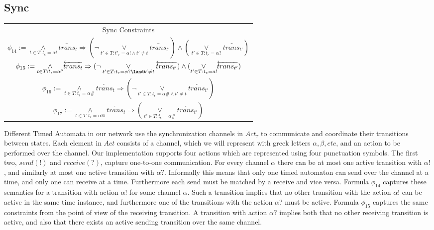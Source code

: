 \documentclass[a4paper,12pt]{article}
\begin{document}
\subsection{Sync}
\label{sec:org75072f2}
\begin{center}
\begin{tabular}{c}
Sync Constraints \\
\(\phi_{14} := \underset{t \in T: t_\epsilon = \alpha!}{\land} \overleftarrow{trans_t} \Rightarrow (\neg \underset{t' \in T: t'_\epsilon = \alpha!\land t'\neq t}{\lor} \overleftarrow{trans_{t'}}) \land (\underset{t' \in T: t_\epsilon = \alpha?}{\lor} \overleftarrow{trans_{t'}})\) \\
\midrule
\(\phi_{15} := \underset{t \in T: t_\epsilon = \alpha?}{\land} \overleftarrow{trans_t} \Rightarrow (\neg \underset{t' \in T:t_\epsilon = \alpha?\landt'\neq t}{\lor} \overleftarrow{trans_{t'}}) \land (\underset{t' \in T:t_\epsilon = a!}{\lor} \overleftarrow{trans_{t'}})\) \\
\midrule
\(\phi_{16} := \underset{t \in T:t_\epsilon = \alpha\#}{\land} \overleftarrow{trans_t} \Rightarrow (\neg \underset{t' \in T:t_\epsilon = \alpha\#\land t' \neq t}{\lor} \overleftarrow{trans_{t'}}) \) \\
\midrule
\(\phi_{17} := \underset{t \in T:t_\epsilon = \alpha@}{\land} \overleftarrow{trans_t} \Rightarrow (\underset{t' \in T: t_\epsilon = \alpha\#}{\lor} \overleftarrow{trans_{t'}}) \)

\end{tabular}
\end{center}

Different Timed Automata in our network use the synchronization channels in
\(Act_\tau\) to communicate and coordinate their transitions between states.
Each element in \(Act\) consists of a channel, which we will represent with
greek letters \(\alpha, \beta, etc\), and an action to be performed over the
channel. Our implementation supports four actions which are represented using
four punctuation symbols. The first two, \(send(!)\) and \(receive(?)\), capture
one-to-one communication. For every channel \(\alpha\) there can be at most one
active transition with \(\alpha!\), and similarly at most one active transition
with \(\alpha?\). Informally this means that only one timed automaton can send
over the channel at a time, and only one can receive at a time. Furthermore each
send must be matched by a receive and vice versa. Formula \(\phi_{14}\) captures
these semantics for a transition with action \(\alpha!\) for some channel
\(\alpha\). Such a transition implies that no other transition with the action
\(\alpha!\) can be active in the same time instance, and furthermore one of the
transitions with the action \(\alpha?\) must be active. Formula \(\phi_{15}\)
captures the same constraints from the point of view of the receiving
transition. A transition with action \(\alpha?\) implies both that no other
receiving transition is active, and also that there exists an active sending
transition over the same channel.
\end{document}
